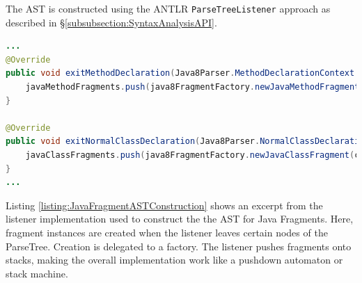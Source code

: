 The \gls{AST} is constructed using the \gls{ANTLR} \texttt{ParseTreeListener} approach as described in §\ref{subsubsection:SyntaxAnalysisAPI}.
\begin{lstlisting}[language=Java,caption={Construction of Java Fragment ASTs},label={listing:JavaFragmentASTConstruction}]
...
@Override
public void exitMethodDeclaration(Java8Parser.MethodDeclarationContext ctx) {
    javaMethodFragments.push(java8FragmentFactory.newJavaMethodFragment(ctx, javaMethodModifierFragments));
}

@Override
public void exitNormalClassDeclaration(Java8Parser.NormalClassDeclarationContext ctx) {
    javaClassFragments.push(java8FragmentFactory.newJavaClassFragment(ctx, javaClassModifierFragments, javaFieldFragments, javaMethodFragments, declaredPackage));
}
...
\end{lstlisting}
Listing \ref{listing:JavaFragmentASTConstruction} shows an excerpt from the listener implementation used to construct the the \gls{AST} for \gls{Java} \glspl{Fragment}.
Here, fragment instances are created when the listener leaves certain nodes of the \gls{ParseTree}.
Creation is delegated to a factory.
The listener pushes fragments onto stacks, making the overall implementation work like a pushdown automaton or stack machine.



